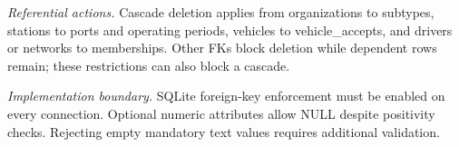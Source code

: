 \documentclass[sigconf,screen,nonacm]{acmart}
\begin{document}
\medskip
\noindent\textit{Referential actions.}
Cascade deletion applies from organizations to subtypes, stations to ports and operating periods, vehicles to vehicle\_accepts, and drivers or networks to memberships. Other FKs block deletion while dependent rows remain; these restrictions can also block a cascade.

\medskip
\noindent\textit{Implementation boundary.}
SQLite foreign-key enforcement must be enabled on every connection. Optional numeric attributes allow NULL despite positivity checks. Rejecting empty mandatory text values requires additional validation.

\endgroup
\end{document}
